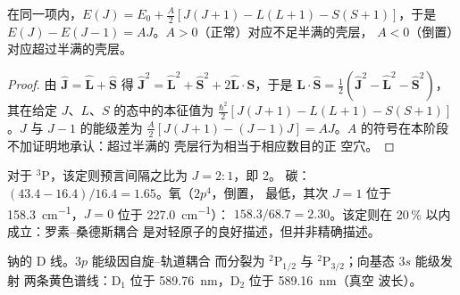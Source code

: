 \begin{proposition}[朗德间隔定则]\label{prop:b3:many-electron-atoms:lande}
在同一项内，$E(J) = E_0 + \frac{A}{2}[J(J+1) - L(L+1) - S(S+1)]$，于是
$E(J) - E(J - 1) = AJ$。$A > 0$（正常）对应不足半满的壳层，
$A < 0$（倒置）对应超过半满的壳层。
\end{proposition}

\begin{proof}
由 $\hat{\mathbf J} = \hat{\mathbf L} + \hat{\mathbf S}$ 得 $\hat{\mathbf J}^2 =
\hat{\mathbf L}^2 + \hat{\mathbf S}^2 + 2\hat{\mathbf L}\cdot\hat{\mathbf S}$，于是
$\hat{\mathbf L}\cdot\hat{\mathbf S} = \frac12(\hat{\mathbf J}^2 - \hat{\mathbf L}^2 -
\hat{\mathbf S}^2)$，其在给定 $J$、$L$、$S$ 的态中的本征值为
$\frac{\hbar^2}{2}[J(J+1) - L(L+1) - S(S+1)]$。$J$ 与
$J - 1$ 的能级差为 $\frac A2[J(J+1) - (J-1)J] = AJ$。$A$ 的符号在本阶段不加证明地承认：超过半满的
壳层行为相当于相应数目的正
空穴。
\end{proof}

\begin{example}[检验间隔定则]\label{ex:b3:many-electron-atoms:lande-test}
对于 ${}^3$P，该定则预言间隔之比为 $J = 2 : 1$，即 2。
碳：$(43.4 - 16.4)/16.4 = 1.65$。氧（$2p^4$，倒置，
最低，其次 $J = 1$ 位于 \qty{158.3}{cm^{-1}}，$J = 0$ 位于 \qty{227.0}{cm^{-1}}）：
$158.3/68.7 = 2.30$。该定则在 20\,\% 以内成立：罗素–桑德斯耦合
是对轻原子的良好描述，但并非精确描述。
\end{example}

\begin{omfigure}

{\small 钠的 D 线。$3p$ 能级因自旋–轨道耦合
而分裂为 ${}^2$P$_{1/2}$ 与 ${}^2$P$_{3/2}$；向基态 $3s$ 能级发射
两条黄色谱线：D$_1$ 位于 \qty{589.76}{nm}，D$_2$ 位于 \qty{589.16}{nm}（真空
波长）。}
\end{omfigure}

